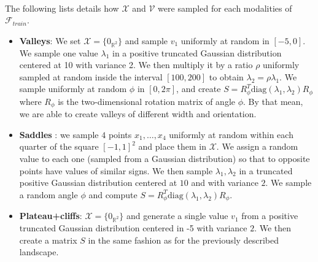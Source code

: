 {{		\paragraph{} The following lists details how $\mathcal{X}$ and $\mathcal{V}$ were sampled for each modalities of $\mathcal{F}_{train}$.
		\begin{itemize}
			\item \textbf{Valleys}: We set $\mathcal{X} = \{ 0_{\mathbb{R}^2} \}$ and sample $v_1$ uniformly at random in $[-5,0]$. We sample one value $\lambda_1$ in a positive truncated Gaussian distribution centered at 10 with variance 2. We then multiply it by a ratio $\rho$ uniformly sampled at random inside the interval $[100,200]$ to obtain $\lambda_2 = \rho \lambda_1$. We sample uniformly at random $\phi$ in $[0,2\pi]$, and create $S = R_\phi^T \text{diag}(\lambda_1,\lambda_2) R_\phi$ where $R_\phi$ is the two-dimensional rotation matrix of angle $\phi$. By that mean, we are able to create valleys of different width and orientation.
			\item \textbf{Saddles} : we sample $4$ points $x_1,\hdots, x_4$ uniformly at random within each quarter of the square $[-1,1]^2$ and place them in $\mathcal{X}$. We assign a random value to each one (sampled from a Gaussian distribution) so that to opposite points have values of similar signs. We then sample $\lambda_1,\lambda_2$ in a truncated positive Gaussian distribution centered at $10$ and with variance $2$. We sample a random angle $\phi$ and compute $S = R_\phi^T \text{diag}(\lambda_1,\lambda_2) R_\phi$.
			\item \textbf{Plateau+cliffs}:  $\mathcal{X} = \{ 0_{\mathbb{R}^2} \}$  and generate a single value $v_1$ from a positive truncated Gaussian distribution centered in -5 with variance $2$. We then create a matrix $S$ in the same fashion as for the previously described landscape. 
		\end{itemize}

	}
	
}
